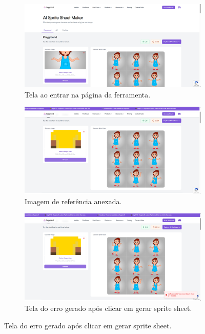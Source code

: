 \begin{figure}[htbp]
    \centering
    \caption{\small Processo da utilização do AI Sprite Sheet Maker}
    \label{fig:segmind1}
    \begin{subfigure}{1\linewidth}
        \includegraphics[width=0.85\linewidth]{figs/segmind/segmind_inicial.PNG}
        \caption{\small Tela ao entrar na página da ferramenta.}
        \label{fig:segmind1a}
    \end{subfigure}
    \begin{subfigure}{1\linewidth}
        \includegraphics[width=0.9\linewidth]{figs/segmind/segmind_tentando.PNG}
        \caption{\small Imagem de referência anexada.}
        \label{fig:segmind1b}
    \end{subfigure}
    \begin{subfigure}{1\linewidth}
        \includegraphics[width=0.9\linewidth]{figs/segmind/segmind_erro.PNG}
        \caption{\small Tela do erro gerado após clicar em gerar sprite sheet.}
        \label{fig:segmind1cd}
    \end{subfigure}
\end{figure}